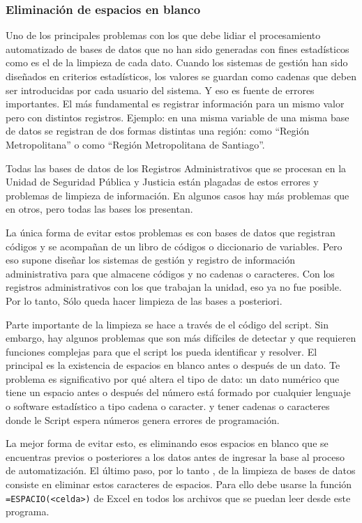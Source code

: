 \documentclass[
  spanish,
]{book}
\begin{document}
\hypertarget{eliminaciuxf3n-de-espacios-en-blanco}{%
\subsubsection{Eliminación de espacios en blanco}\label{eliminaciuxf3n-de-espacios-en-blanco}}

Uno de los principales problemas con los que debe lidiar el procesamiento automatizado de bases de datos que no han sido generadas con fines estadísticos como es el de la limpieza de cada dato. Cuando los sistemas de gestión han sido diseñados en criterios estadísticos, los valores se guardan como cadenas que deben ser introducidas por cada usuario del sistema. Y eso es fuente de errores importantes. El más fundamental es registrar información para un mismo valor pero con distintos registros. Ejemplo: en una misma variable de una misma base de datos se registran de dos formas distintas una región: como ``Región Metropolitana'' o como ``Región Metropolitana de Santiago''.

Todas las bases de datos de los Registros Administrativos que se procesan en la Unidad de Seguridad Pública y Justicia están plagadas de estos errores y problemas de limpieza de información. En algunos casos hay más problemas que en otros, pero todas las bases los presentan.

La única forma de evitar estos problemas es con bases de datos que registran códigos y se acompañan de un libro de códigos o diccionario de variables. Pero eso supone diseñar los sistemas de gestión y registro de información administrativa para que almacene códigos y no cadenas o caracteres. Con los registros administrativos con los que trabajan la unidad, eso ya no fue posible. Por lo tanto, Sólo queda hacer limpieza de las bases a posteriori.

Parte importante de la limpieza se hace a través de el código del script. Sin embargo, hay algunos problemas que son más difíciles de detectar y que requieren funciones complejas para que el script los pueda identificar y resolver. El principal es la existencia de espacios en blanco antes o después de un dato. Te problema es significativo por qué altera el tipo de dato: un dato numérico que tiene un espacio antes o después del número está formado por cualquier lenguaje o software estadístico a tipo cadena o caracter. y tener cadenas o caracteres donde le Script espera números genera errores de programación.

La mejor forma de evitar esto, es eliminando esos espacios en blanco que se encuentras previos o posteriores a los datos antes de ingresar la base al proceso de automatización. El último paso, por lo tanto , de la limpieza de bases de datos consiste en eliminar estos caracteres de espacios. Para ello debe usarse la función \texttt{=ESPACIO(\textless{}celda\textgreater{})} de Excel en todos los archivos que se puedan leer desde este programa.
\end{document}
